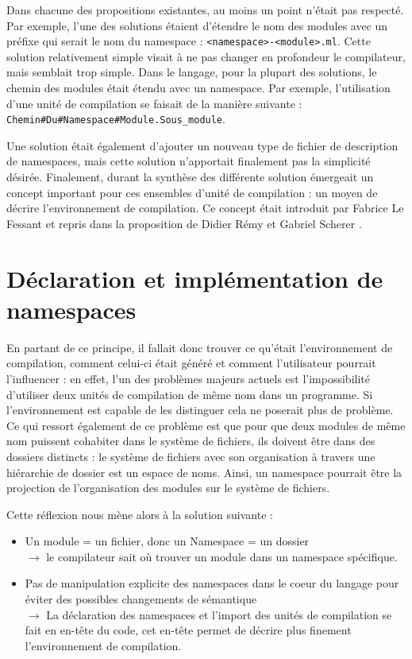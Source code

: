 \documentclass[11pt,a4paper]{report}
\begin{document}
Dans chacune des propositions existantes, au moins un point n'était pas
respecté. Par exemple, l'une des solutions étaient d'étendre le nom des modules
avec un préfixe qui serait le nom du namespace :
\texttt{<namespace>-<module>.ml}. Cette solution relativement simple visait à ne
pas changer en profondeur le compilateur, mais semblait trop simple. Dans le
langage, pour la plupart des solutions, le chemin des modules était étendu avec
un namespace. Par exemple, l'utilisation d'une unité de compilation se faisait
de la manière suivante :
\texttt{Chemin\#Du\#Namespace\#Module.Sous\_module}. 

Une solution était également d'ajouter un nouveau type de fichier de description
de namespaces, mais cette solution n'apportait finalement pas la simplicité
désirée. Finalement, durant la synthèse des différente solution émergeait un
concept important pour ces ensembles d'unité de compilation : un moyen de
décrire l'environnement de compilation. Ce concept était introduit par Fabrice
Le Fessant \cite{lefessant-prop} et repris dans la proposition de Didier Rémy et
Gabriel Scherer \cite{remy-scherer-prop}.

\section{Déclaration et implémentation de namespaces}

En partant de ce principe, il fallait donc trouver ce qu'était l'environnement
de compilation, comment celui-ci était généré et comment l'utilisateur pourrait
l'influencer : en effet, l'un des problèmes majeurs actuels est l'impossibilité
d'utiliser deux unités de compilation de même nom dans un programme. Si
l'environnement est capable de les distinguer cela ne poserait plus de
problème. Ce qui ressort également de ce problème est que pour que deux modules
de même nom puissent cohabiter dans le système de fichiers, ils doivent être
dans des dossiers distincts : le système de fichiers avec son organisation à
travers une hiérarchie de dossier est un espace de noms. Ainsi, un namespace
pourrait être la projection de l'organisation des modules sur le système de
fichiers.

Cette réflexion nous mène alors à la solution suivante :
\begin{itemize}
\item Un module = un fichier, donc un Namespace = un dossier \\ $\rightarrow$ le
  compilateur sait où trouver un module dans un namespace spécifique.
\item Pas de manipulation explicite des namespaces dans le coeur du langage pour
  éviter des possibles changements de sémantique \\
  $\rightarrow$ La déclaration des namespaces et l'import des unités de
  compilation se fait en en-tête du code, cet en-tête permet de décrire plus
  finement l'environnement de compilation.
\end{itemize}
\end{document}
